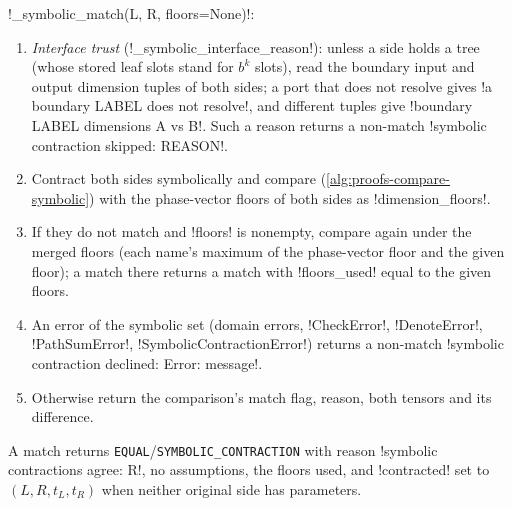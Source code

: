\begin{algorithm}\label{alg:proofs-symbolic-match}
\py!_symbolic_match(L, R, floors=None)!:
\begin{enumerate}
\item \emph{Interface trust} (\py!_symbolic_interface_reason!): unless a side holds a tree \bbox{} (whose stored leaf slots stand for $b^k$ slots), read the boundary input and output dimension tuples of both sides; a port that does not resolve gives \code!a boundary LABEL does not resolve!, and different tuples give \code!boundary LABEL dimensions A vs B!. Such a reason returns a non-match \code!symbolic contraction skipped: REASON!.
\item Contract both sides symbolically and compare (\cref{alg:proofs-compare-symbolic}) with the phase-vector floors of both sides as \py!dimension_floors!.
\item If they do not match and \py!floors! is nonempty, compare again under the merged floors (each name's maximum of the phase-vector floor and the given floor); a match there returns a match with \py!floors_used! equal to the given floors.
\item An error of the symbolic set (domain errors, \py!CheckError!, \py!DenoteError!, \py!PathSumError!, \py!SymbolicContractionError!) returns a non-match \code!symbolic contraction declined: Error: message!.
\item Otherwise return the comparison's match flag, reason, both tensors and its difference.
\end{enumerate}
\end{algorithm}

A match returns \texttt{EQUAL}/\allowbreak\texttt{SYMBOLIC\_CONTRACTION} with reason \code!symbolic contractions agree: R!, no assumptions, the floors used, and \py!contracted! set to $(L,R,t_L,t_R)$ when neither original side has parameters.

